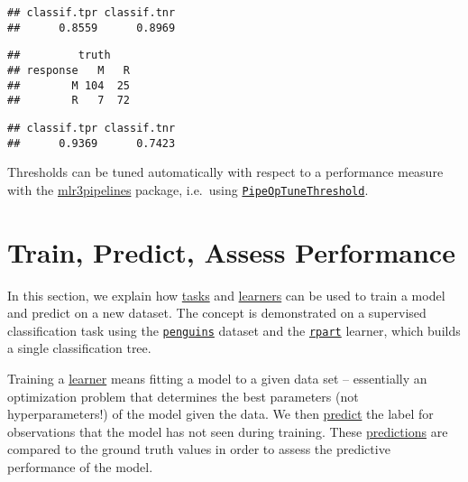 \documentclass[
]{scrbook}
\newenvironment{Shaded}{\begin{snugshade}}{\end{snugshade}}
\newcommand{\FloatTok}[1]{\textcolor[rgb]{0.00,0.00,0.81}{#1}}
\newcommand{\FunctionTok}[1]{\textcolor[rgb]{0.00,0.00,0.00}{#1}}
\newcommand{\NormalTok}[1]{#1}
\newcommand{\SpecialCharTok}[1]{\textcolor[rgb]{0.00,0.00,0.00}{#1}}
\renewenvironment{Shaded} {\begin{snugshade}\small} {\end{snugshade}}
\begin{document}
\begin{verbatim}
## classif.tpr classif.tnr 
##      0.8559      0.8969
\end{verbatim}

\begin{Shaded}
\end{Shaded}

\begin{verbatim}
##         truth
## response   M   R
##        M 104  25
##        R   7  72
\end{verbatim}

\begin{Shaded}
\end{Shaded}

\begin{verbatim}
## classif.tpr classif.tnr 
##      0.9369      0.7423
\end{verbatim}

Thresholds can be tuned automatically with respect to a performance measure with the \href{https://mlr3pipelines.mlr-org.com}{mlr3pipelines} package, i.e.~using \href{https://mlr3pipelines.mlr-org.com/reference/mlr_pipeops_tunethreshold.html}{\texttt{PipeOpTuneThreshold}}.

\hypertarget{train-predict}{%
\section{Train, Predict, Assess Performance}\label{train-predict}}

In this section, we explain how \protect\hyperlink{tasks}{tasks} and \protect\hyperlink{learners}{learners} can be used to train a model and predict on a new dataset.
The concept is demonstrated on a supervised classification task using the \href{https://mlr3.mlr-org.com/reference/mlr_tasks_penguins.html}{\texttt{penguins}} dataset and the \href{https://mlr3.mlr-org.com/reference/mlr_learners_classif.rpart.html}{\texttt{rpart}} learner, which builds a single classification tree.

Training a \protect\hyperlink{learners}{learner} means fitting a model to a given data set -- essentially an optimization problem that determines the best parameters (not hyperparameters!) of the model given the data.
We then \protect\hyperlink{predicting}{predict} the label for observations that the model has not seen during training.
These \protect\hyperlink{predicting}{predictions} are compared to the ground truth values in order to assess the predictive performance of the model.
\end{document}
